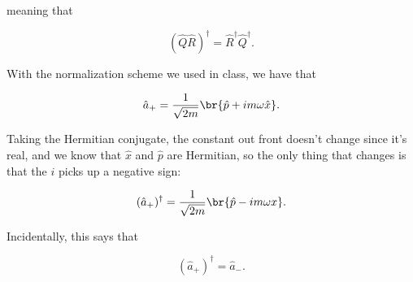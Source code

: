 \begin{parts}
meaning that

\begin{equation}
    (\hat{Q}\hat{R})^{\dagger} = \hat{R}^{\dagger}\hat{Q}^{\dagger}.
\end{equation}





\item With the normalization scheme we used in class, we have that

\begin{equation}
    \hat{a}_+ = \frac{1}{\sqrt{2m}}\br{\hat{p} + im\omega\hat{x}}.
\end{equation}

Taking the Hermitian conjugate, the constant out front doesn't change since it's real, and we know that $\hat{x}$ and $\hat{p}$ are Hermitian, so the only thing that changes is that the $i$ picks up a negative sign:

\begin{equation}
    (\hat{a}_+)^{\dagger} = \frac{1}{\sqrt{2m}}\br{\hat{p} - im\omega x}.
\end{equation}

Incidentally, this says that

\begin{equation}
    (\hat{a}_+)^{\dagger} = \hat{a}_-.
\end{equation}



\end{parts}